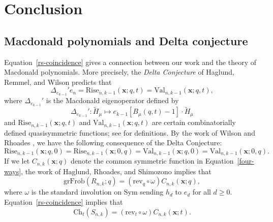 \documentclass[ALCO,ThmDefs,published]{cedram}
\newcommand{\xx}{{\mathbf {x}}}
\theoremstyle{plain}
\newcommand{\maj}{{\mathrm {maj}}}
\newcommand{\Val}{{\mathrm {Val}}}
\newcommand{\Rise}{{\mathrm {Rise}}}
\newcommand{\grFrob}{{\mathrm {grFrob}}}
\newcommand{\rev}{{\mathrm {rev}}}
\newcommand{\Sym}{{\mathrm {Sym}}}
\newcommand{\Ch}{{\mathrm {Ch}}}
\newcommand{\OP}{{\mathcal{OP}}}
\newcommand{\xx}{{\mathbf {x}}}
\newcommand{\ii}{{\mathbf{i}}}
\begin{document}


\section{Conclusion}
\label{Conclusion}

\subsection{Macdonald polynomials and Delta conjecture}
Equation~\eqref{rs-coincidence} gives a connection between our work and the theory of Macdonald polynomials.
More precisely, the \emph{Delta Conjecture} of Haglund, Remmel, and Wilson \cite{HRW} predicts that 
\begin{equation}
\Delta_{e_{k-1}}' e_n = \Rise_{n,k-1}(\xx;q,t) = \Val_{n,k-1}(\xx;q,t),
\end{equation}
where $\Delta_{e_{k-1}}'$ is the Macdonald eigenoperator defined by
\begin{equation}
\Delta_{e_{k-1}}': \tilde{H}_{\mu} \mapsto e_{k-1}[B_{\mu}(q,t) - 1] \cdot \tilde{H}_{\mu}
\end{equation}
and $\Rise_{n,k-1}(\xx;q,t)$ and $\Val_{n,k-1}(\xx;q,t)$ are certain combinatorially defined
quasisymmetric functions; see \cite{HRW} for  definitions.
By the work of 
Wilson \cite{WMultiset} and Rhoades \cite{Rhoades}, we have the following consequence of the Delta Conjecture:
\begin{equation}
\label{four-ways}
\Rise_{n,k-1}(\xx;q,0) = \Rise_{n,k-1}(\xx;0,q) = \Val_{n,k-1}(\xx;q,0) = \Val_{n,k-1}(\xx;0,q).
\end{equation}
If we let $C_{n,k}(\xx;q)$ denote the common symmetric function in Equation~\eqref{four-ways},
the work of Haglund, Rhoades, and Shimozono \cite[Thm. 6.11]{HRS} implies that 
\begin{equation}
\grFrob(R_{n,k}; q) = (\rev_q \circ \omega) C_{n,k}(\xx;q),
\end{equation}
where $\omega$ is the standard involution on $\Sym$ sending $h_d$ to $e_d$ for all $d \geq 0$.
Equation~\eqref{rs-coincidence} implies that
\begin{equation}
\Ch_t(S_{n,k}) = (\rev_t \circ \omega) C_{n,k}(\xx;t).
\end{equation}
\end{document}

